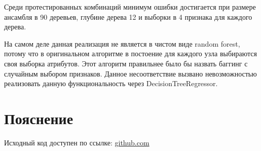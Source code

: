 \documentclass{article} %
\begin{document}
Среди протестированных комбинаций минимум ошибки достигается
при размере ансамбля в 90 деревьев,
глубине дерева 12 и выборки в 4 признака для каждого дерева.

На самом деле данная реализация
не является в чистом виде random forest,
потому что в оригинальном алгоритме
в постоение для каждого узла выбираются
своя выборка атрибутов.
Этот алгоритм правильнее было бы назвать
баггинг с случайным выбором признаков.
Данное несоответствие вызвано
невозможностью реализовать данную функциональность
через DecisionTreeRegressor.

\section{Пояснение}
Исходный код доступен по ссылке:
\href{https://github.com/SvichkarevAnatoly/Course-Python-Bioinformatics/tree/master/semester2/task9}
{github.com}
\end{document}
